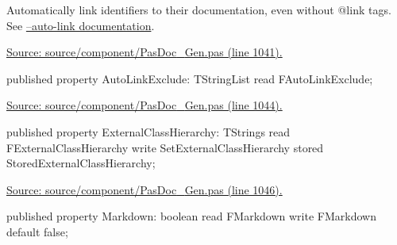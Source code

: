 \documentclass{report}
\newif\ifpdf
\begin{document}
\begin{list}{}
\begin{flushleft}
\ifpdf
\end{flushleft}
\fi


\par Automatically link identifiers to their documentation, even without @link tags. See \href{https://pasdoc.github.io/AutoLinkOption}{--auto-link documentation}.\par
\href{https://github.com/pasdoc/pasdoc/blob/master/source/component/PasDoc_Gen.pas#L1041}{Source: source/component/PasDoc{\_}Gen.pas (line 1041).}\label{PasDoc_Gen.TDocGenerator-AutoLinkExclude}
\item[\textbf{AutoLinkExclude}\hfill]
\ifpdf
\begin{flushleft}
\fi
\begin{ttfamily}
published property AutoLinkExclude: TStringList read FAutoLinkExclude;\end{ttfamily}

\ifpdf
\end{flushleft}
\fi


\par  \par
\href{https://github.com/pasdoc/pasdoc/blob/master/source/component/PasDoc_Gen.pas#L1044}{Source: source/component/PasDoc{\_}Gen.pas (line 1044).}\label{PasDoc_Gen.TDocGenerator-ExternalClassHierarchy}
\item[\textbf{ExternalClassHierarchy}\hfill]
\ifpdf
\begin{flushleft}
\fi
\begin{ttfamily}
published property ExternalClassHierarchy: TStrings
      read FExternalClassHierarchy write SetExternalClassHierarchy
      stored StoredExternalClassHierarchy;\end{ttfamily}

\ifpdf
\end{flushleft}
\fi


\par  \par
\href{https://github.com/pasdoc/pasdoc/blob/master/source/component/PasDoc_Gen.pas#L1046}{Source: source/component/PasDoc{\_}Gen.pas (line 1046).}\label{PasDoc_Gen.TDocGenerator-Markdown}
\item[\textbf{Markdown}\hfill]
\ifpdf
\begin{flushleft}
\fi
\begin{ttfamily}
published property Markdown: boolean
      read FMarkdown write FMarkdown default false;\end{ttfamily}


\end{flushleft}
\end{list}
\end{document}
